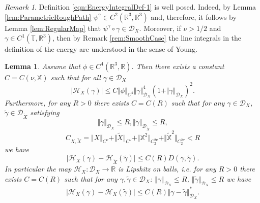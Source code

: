 \documentclass[11pt,a4paper,reqno]{amsart}%
\theoremstyle{plain}
\theoremstyle{remark}
\newtheorem{remark}[theorem]{Remark}
\theoremstyle{plain}
\newtheorem{lemma}[theorem]{Lemma}
\numberwithin{equation}{section}
\def\Rnu{{\mathbb R}}
\begin{document}
\begin{remark}\label{rem:CorrectEnergyDef}
Definition
\eqref{eqn:EnergyIntegralDef-1}
is well posed. Indeed, by Lemma \ref{lem:ParametricRoughPath}
$\psi^{\gamma}\in C^2(\Rnu^3,\Rnu^3)$ and, therefore, it
follows by Lemma \ref{lem:RegularMap} that
$\psi^{\gamma} \circ\gamma\in \mathcal{D}_X$.
Moreover, if $\nu>{1}/{2}$ and $\gamma\in C^1(\mathbb{T},\Rnu^3)$, 
then by Remark \ref{rem:SmoothCase} the line integrals in the
definition of the energy are understood in the sense of Young.
\end{remark}
\begin{lemma}\label{lem:EnergyProperties}
Assume that $\phi\in C^4(\Rnu^3,\Rnu)$. Then there exists a constant
$C=C(\nu,\mathbb{X})$ such that for all $\gamma\in \mathcal{D}_X$
\begin{equation}
\vert \mathcal{H}_X(\gamma)\vert \leq
C\Vert \phi\Vert_{C^4}\Vert \gamma\Vert_{\mathcal{D}_X}^4(1+\Vert \gamma\Vert_{\mathcal{D}_X})^2.\label{eqn:EnergyEstimAbove}
\end{equation}
Furthermore, for any $R>0$ there exists $C=C(R)$ such that for any
$\gamma\in\mathcal{D}_X$,
$\tilde{\gamma}\in\mathcal{D}_{\tilde{X}}$ satisfying
$$
\Vert \gamma\Vert_{\mathcal{D}_X}\leq R,
\Vert \tilde{\gamma}\Vert_{\mathcal{D}_{\tilde{X}}}\leq R,
$$
$$
C_{X,\tilde{X}}=\Vert X\Vert_{C^{\nu}}+\Vert \tilde{X}\Vert_{C^{\nu}}+\Vert \mathbb{X}^2\Vert_{C_2^{2\nu}}+\Vert \mathbb{\tilde{X}}^2\Vert_{C_2^{2\nu}}<R
$$
we have
\begin{equation}
\vert \mathcal{H}_X(\gamma)-\mathcal{H}_{\tilde{X}}(\tilde{\gamma})\vert \leq
C(R)D(\gamma,\tilde{\gamma}).\label{eqn:LocLipshitz-2}
\end{equation}
In particular the map $\mathcal{H}_X:\mathcal{D}_X\to\Rnu$ is 
Lipshitz on balls,  i.e. for any $R>0$ there exists $C=C(R)$ such that for
any $\gamma,\tilde{\gamma}\in\mathcal{D}_X$: 
$\Vert \gamma\Vert_{\mathcal{D}_X}\leq R$,  $\Vert \tilde{\gamma}\Vert_{\mathcal{D}_X}\leq R$
we have
\begin{equation}
\vert \mathcal{H}_X(\gamma)-\mathcal{H}_X(\tilde{\gamma})\vert \leq
C(R)\Vert \gamma-\tilde{\gamma}\Vert_{\mathcal{D}_X}^*.\label{eqn:LocLipshitz}
\end{equation}
\end{lemma}
\end{document}
